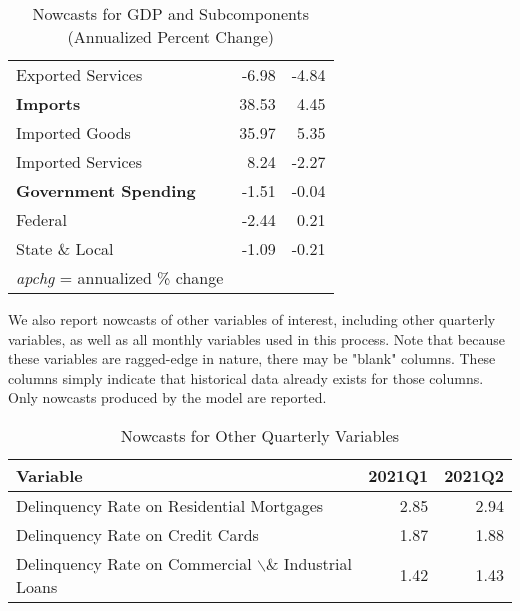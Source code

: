 \documentclass[11pt, letterpaper]{article}\usepackage[]{graphicx}\usepackage[]{color}
\begin{document}
\begin{table}[H]
\begin{tabular}{lrr}
  \hspace{8mm}  Exported Services & -6.98 & -4.84 \\ 
  \hspace{0mm} \textbf{Imports} & 38.53 & 4.45 \\ 
  \hspace{8mm}  Imported Goods & 35.97 & 5.35 \\ 
  \hspace{8mm}  Imported Services & 8.24 & -2.27 \\ 
  \hspace{0mm} \textbf{Government Spending} & -1.51 & -0.04 \\ 
  \hspace{8mm}  Federal & -2.44 & 0.21 \\ 
  \hspace{8mm}  State \& Local & -1.09 & -0.21 \\ 
   \hline 
 \textit{apchg} = annualized \% change 
\end{tabular}
\endgroup
\caption{Nowcasts for GDP and Subcomponents (Annualized Percent Change)} 
\end{table}


We also report nowcasts of other variables of interest, including other quarterly variables, as well as all monthly variables used in this process. Note that because these variables are ragged-edge in nature, there may be "blank" columns. These columns simply indicate that historical data already exists for those columns. Only nowcasts produced by the model are reported.
\begin{table}[H]
\centering
\begingroup\fontsize{11pt}{13pt}\selectfont
\begin{tabular}{lrr}
  \hline
Variable & 2021Q1 & 2021Q2 \\ 
  \hline
Delinquency Rate on Residential Mortgages & 2.85 & 2.94 \\ 
  Delinquency Rate on Credit Cards & 1.87 & 1.88 \\ 
  Delinquency Rate on Commercial $\backslash$\& Industrial Loans & 1.42 & 1.43 \\ 
   \hline
\end{tabular}
\endgroup
\caption{Nowcasts for Other Quarterly Variables} 
\end{table}
\end{document}
